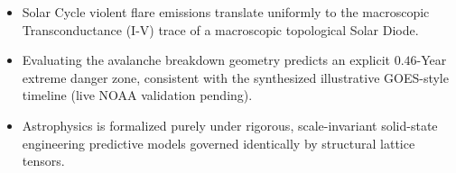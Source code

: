 \begin{summarybox}
\begin{itemize}
    \item Solar Cycle violent flare emissions translate uniformly to the macroscopic Transconductance (I-V) trace of a macroscopic topological Solar Diode.
    \item Evaluating the avalanche breakdown geometry predicts an explicit $0.46$-Year extreme danger zone, consistent with the synthesized illustrative GOES-style timeline (live NOAA validation pending).
    \item Astrophysics is formalized purely under rigorous, scale-invariant solid-state engineering predictive models governed identically by structural lattice tensors.
\end{itemize}
\end{summarybox}

